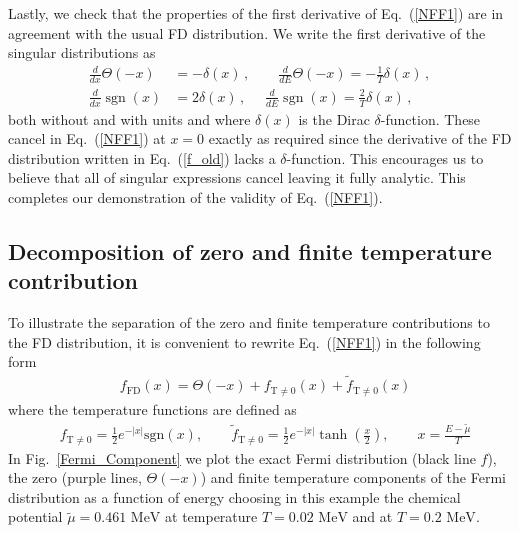 \documentclass[sn-mathphys,Numbered]{sn-jnl}
\newcommand{\req}[1]{Eq.~(\ref{#1})}
\newcommand*{\MeV}{\text{ MeV}}
\DeclareMathOperator{\sgn}{sgn}
\newcommand*{\xmagenta}{\color{magenta}}
\begin{document}
Lastly, we check that the properties of the first derivative of \req{NFF1} are in agreement with the usual FD distribution. We write the first derivative of the singular distributions as 
\begin{align}
\label{NFF1b}
\frac{d}{dx}\Theta(-x)&=-\delta(x)\,,\qquad 
\frac{d}{dE}\Theta(-x)=-\frac{1}{T}\delta(x)\,,\\
\frac{d}{dx}\sgn(x)&=2\delta(x)\,,\,\,\quad 
\frac{d}{dE}\sgn(x)=\frac{2}{T}\delta(x)\,,
\end{align}
both without and with units and where $\delta(x)$ is the Dirac $\delta$-function. These cancel in \req{NFF1} at $x=0$ exactly as required since the derivative of the FD distribution written in \req{f_old} lacks a $\delta$-function. This encourages us to believe that all of singular expressions cancel leaving it fully analytic. This completes our demonstration of the validity of \req{NFF1}.

\subsection{Decomposition of zero and finite temperature contribution}
\label{Numerical}

To illustrate the separation of the zero and finite temperature contributions to the FD distribution, it is convenient to rewrite Eq.~(\ref{NFF1}) in the following form
\begin{align}\label{Eq_form}
&f_\mathrm{FD}(x)=\Theta(-x)+f_\mathrm{T\neq0}(x)+\tilde f_\mathrm{T\neq0}(x)
\end{align}
where the temperature functions are defined as
\begin{align}
&f_\mathrm{T\neq0}=\frac{1}{2}e^{ -|x| }\mathrm{sgn}\left(x\right),\qquad
\tilde f_\mathrm{T\neq0}=\frac{1}{2}e^{ - |x| }\tanh\left(\frac{x}{2}\right),\qquad x=\frac{E-\tilde\mu}{T}
\end{align}
In Fig.~\ref{Fermi_Component} we plot the exact Fermi distribution (black line $f$), the zero (purple lines, $\Theta(-x)$) and finite temperature components of the Fermi distribution as a function of energy choosing in this example the chemical potential $\widetilde\mu=0.461\MeV$ at temperature $T=0.02\MeV$ and at $T=0.2\MeV$.
\end{document}
